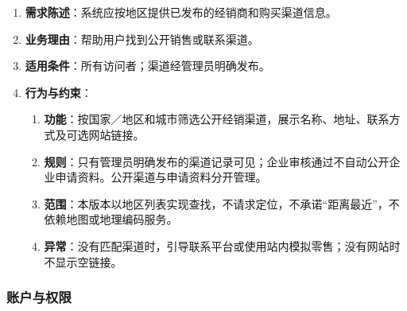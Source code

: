 \begin{enumerate}
\item {\bfseries 需求陈述}：系统应按地区提供已发布的经销商和购买渠道信息。
\item {\bfseries 业务理由}：帮助用户找到公开销售或联系渠道。
\item {\bfseries 适用条件}：所有访问者；渠道经管理员明确发布。
\item {\bfseries 行为与约束}：
\begin{enumerate}
\item {\bfseries 功能}：按国家／地区和城市筛选公开经销渠道，展示名称、地址、联系方式及可选网站链接。
\item {\bfseries 规则}：只有管理员明确发布的渠道记录可见；企业审核通过不自动公开企业申请资料。公开渠道与申请资料分开管理。
\item {\bfseries 范围}：本版本以地区列表实现查找，不请求定位，不承诺“距离最近”，不依赖地图或地理编码服务。
\item {\bfseries 异常}：没有匹配渠道时，引导联系平台或使用站内模拟零售；没有网站时不显示空链接。
\end{enumerate}

\end{enumerate}

\subsubsection{账户与权限}\label{sec:322-账户与权限}


